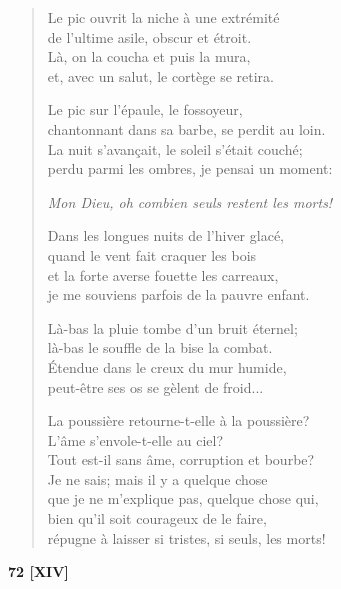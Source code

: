 \begin{verse}
  Le pic ouvrit la niche
  à une extrémité \\
  de l'ultime asile,
  obscur et étroit. \\
  Là, on la coucha
  et puis la mura, \\
  et, avec un salut,
  le cortège se retira.

  Le pic sur l'épaule,
  le fossoyeur, \\
  chantonnant dans sa barbe,
  se perdit au loin. \\
  La nuit s'avançait,
  le soleil s'était couché; \\
  perdu parmi les ombres,
  je pensai un moment:

  \emph{Mon Dieu, oh combien seuls restent les morts!}

  Dans les longues nuits
  de l'hiver glacé, \\
  quand le vent
  fait craquer les bois \\
  et la forte averse
  fouette les carreaux, \\
  je me souviens parfois
  de la pauvre enfant.

  Là-bas la pluie tombe
  d'un bruit éternel; \\
  là-bas le souffle de la bise
  la combat. \\
  Étendue dans le creux
  du mur humide, \\
  peut-être ses os se gèlent
  de froid...

La poussière retourne-t-elle à la poussière? \\
  L'âme s'envole-t-elle au ciel? \\
  Tout est-il sans âme,
  corruption et bourbe? \\
  Je ne sais; mais il y a
  quelque chose \\
  que je ne m'explique pas,
  quelque chose qui, \\
  bien qu'il soit courageux de le faire, \\
  répugne à laisser si tristes,
  si seuls, les morts!
\end{verse}



\begin{center}
  \textbf{72 [XIV]}
\end{center}

